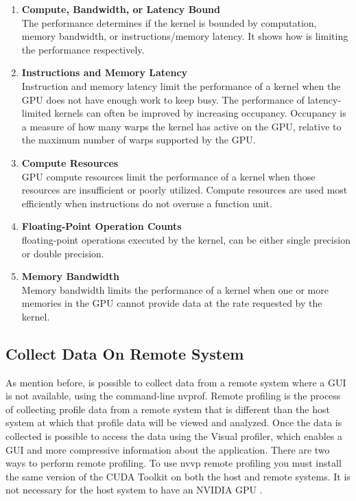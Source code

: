 \begin{enumerate}
  \item \textbf{Compute, Bandwidth, or Latency Bound} \hfill \\
      The performance determines if the kernel is bounded by computation, memory bandwidth, or instructions/memory latency. It shows how is limiting the performance respectively.
  
  \item \textbf{Instructions and Memory Latency} \hfill \\
Instruction and memory latency limit the performance of a kernel when the GPU does not have enough work to keep busy. The performance of latency-limited kernels can often be improved by increasing occupancy. Occupancy is a measure of how many warps the kernel has active on the GPU, relative to the maximum number of warps supported by the GPU.
  
  \item \textbf{Compute Resources} \hfill \\
GPU compute resources limit the performance of a kernel when those resources are insufficient or poorly utilized. Compute resources are used most efficiently when instructions do not overuse a function unit. 
  \item \textbf{Floating-Point Operation Counts} \hfill \\
  floating-point operations executed by the kernel, can be either single precision or double precision.
  
  \item \textbf{Memory Bandwidth} \hfill \\
  Memory bandwidth limits the performance of a kernel when one or more memories in the GPU cannot provide data at the rate requested by the kernel.
\end{enumerate}

\subsection{Collect Data On Remote System}

As mention before, is possible to collect data from a remote system where a GUI is not available, using the command-line nvprof. Remote profiling is the process of collecting profile data from a remote system that is different than the host system at which that profile data will be viewed and analyzed. Once the data is collected is possible to access the data using the Visual profiler, which enables a GUI and more compressive information about the application. There are two ways to perform remote profiling. To use nvvp remote profiling you must install the same version of the CUDA Toolkit on both the host and remote systems. It is not necessary for the host system to have an NVIDIA GPU \cite{tool}.

